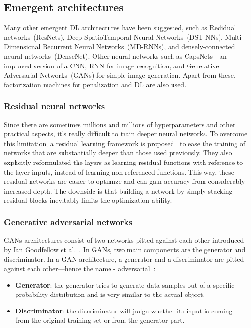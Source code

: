 \subsection{Emergent architectures}
Many other emergent DL architectures have been suggested, such as Redidual networks~(ResNets), Deep SpatioTemporal Neural Networks~(DST-NNs), Multi-Dimensional Recurrent Neural Networks~(MD-RNNs), and densely-connected neural networks~(DenseNet). Other neural networks such as CapsNets - an improved version of a CNN, RNN for image recognition, and Generative Adversarial Networks~(GANs) for simple image generation. Apart from these, factorization machines for penalization and DL are also used. 

\iffalse
\subsubsection{Residual neural networks}
Since there are sometimes millions and millions of hyperparameters and other practical aspects, it's really difficult to train deeper neural networks. To overcome this limitation, a residual learning framework is proposed~\cite{zagoruyko2016wide} to ease the training of networks that are substantially deeper than those used previously. They also explicitly reformulated the layers as learning residual functions with reference to the layer inputs, instead of learning non-referenced functions. This way, these residual networks are easier to optimize and can gain accuracy from considerably increased depth. The downside is that building a network by simply stacking residual blocks inevitably limits the optimization ability. %

\subsubsection{Generative adversarial networks}
GANs architectures consist of two networks pitted against each other introduced by Ian Goodfellow et al.~\cite{GAN}. In GANs, two main components are the generator and discriminator. In a GAN architecture, a generator and a discriminator are pitted against each other—hence the name - adversarial~\cite{GAN}:

\vspace{-2mm}
\begin{itemize}[noitemsep]
    \item \textbf{Generator}: the generator tries to generate data samples out of a specific probability distribution and is very similar to the actual object.
    \item \textbf{Discriminator}: the discriminator will judge whether its input is coming from the original training set or from the generator part. 
\end{itemize}

